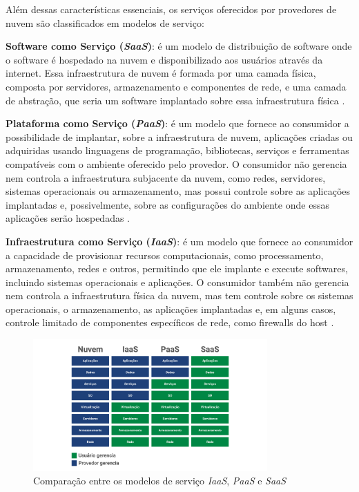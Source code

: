 Além dessas características essenciais, os serviços oferecidos por provedores de nuvem são classificados em modelos de serviço:

\textbf{Software como Serviço (\textit{SaaS})}: é um modelo de distribuição de software onde o software é hospedado na nuvem e disponibilizado aos usuários através da internet. Essa infraestrutura de nuvem é formada por uma camada física, composta por servidores, armazenamento e componentes de rede, e uma camada de abstração, que seria um software implantado sobre essa infraestrutura física \cite{mell2011}. 

\textbf{Plataforma como Serviço (\textit{PaaS})}: é um modelo que fornece ao consumidor a possibilidade de implantar, sobre a infraestrutura de nuvem, aplicações criadas ou adquiridas usando linguagens de programação, bibliotecas, serviços e ferramentas compatíveis com o ambiente oferecido pelo provedor. O consumidor não gerencia nem controla a infraestrutura subjacente da nuvem, como redes, servidores, sistemas operacionais ou armazenamento, mas possui controle sobre as aplicações implantadas e, possivelmente, sobre as configurações do ambiente onde essas aplicações serão hospedadas \cite{mell2011}.

\textbf{Infraestrutura como Serviço (\textit{IaaS})}: é um modelo que fornece ao consumidor a capacidade de provisionar recursos computacionais, como processamento, armazenamento, redes e outros, permitindo que ele implante e execute softwares, incluindo sistemas operacionais e aplicações. O consumidor também não gerencia nem controla a infraestrutura física da nuvem, mas tem controle sobre os sistemas operacionais, o armazenamento, as aplicações implantadas e, em alguns casos, controle limitado de componentes específicos de rede, como firewalls do host \cite{mell2011}.

\begin{figure}[htb]
    \centering
    \includegraphics[width=0.8\textwidth]{figuras/Figura 1 - Comparação entre os modelos de serviço.png}
    \caption{Comparação entre os modelos de serviço \textit{IaaS}, \textit{PaaS} e \textit{SaaS}}
    \label{fig:comparacao-modelos-servico}
\end{figure}

